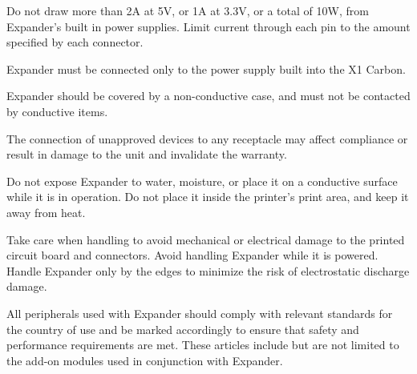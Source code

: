 \documentclass{article}
\begin{document}
Do not draw more than 2A at
5V, or 1A at 3.3V, or a total of 10W, from Expander’s built in power
supplies.  Limit current through each pin to the amount specified by each
connector.

Expander must be connected only to the power supply built into the
X1 Carbon.

Expander should be covered by a non-conductive case, and must not
be contacted by conductive items.

The connection of unapproved devices to any
receptacle may affect compliance or result in damage to the unit and
invalidate the warranty.

Do not expose Expander to water, moisture, or place
it on a conductive surface while it is in operation.  Do not place it inside
the printer’s print area, and keep it away from heat.

Take care when handling to avoid mechanical or electrical damage to the
printed circuit board and connectors.  Avoid handling Expander while it is
powered.  Handle Expander only by the edges to minimize the risk of
electrostatic discharge damage.

All peripherals used with Expander should comply with relevant
standards for the country of use and be marked accordingly to ensure that
safety and performance requirements are met.  These articles include but are
not limited to the add-on modules used in conjunction with Expander.

\enddocument
\end{document}
